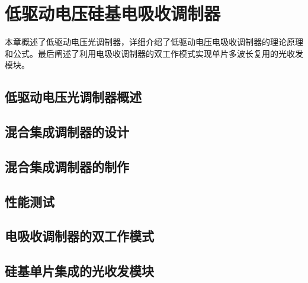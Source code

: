 \chapter{低驱动电压硅基电吸收调制器}
本章概述了低驱动电压光调制器，详细介绍了低驱动电压电吸收调制器的理论原理和公式。最后阐述了利用电吸收调制器的双工作模式实现单片多波长复用的光收发模块。
\section{低驱动电压光调制器概述}
\section{混合集成调制器的设计}
\section{混合集成调制器的制作}
\section{性能测试}
\section{电吸收调制器的双工作模式}
\section{硅基单片集成的光收发模块}
